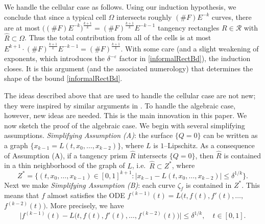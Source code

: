 \documentclass[letterpaper, reqno,11pt]{article}
\numberwithin{equation}{section}
\newcommand{\eps}{\varepsilon}
\numberwithin{thm}{section}
\theoremstyle{remark}
\begin{document}
We handle the cellular case as follows. Using our induction hypothesis, we conclude that since a typical cell $\Omega$ intersects roughly $(\#F) E^{-k}$ curves, there are at most $\big((\#F)E^{-k}\big)^{\frac{k+1}{k}}=(\#F)^{\frac{k+1}{k}}E^{-k-1}$ tangency rectangles $R\in \mathcal{R}$ with $\hat R \subset \Omega$. Thus the total contribution from all of the cells is at most $E^{k+1}\cdot (\#F)^{\frac{k+1}{k}}E^{-k-1} = (\#F)^{\frac{k+1}{k}}$. With some care (and a slight weakening of exponents, which introduces the $\delta^{-\eps}$ factor in \eqref{informalRectBd}), the induction closes. It is this argument (and the associated numerology) that determines the shape of the bound \eqref{informalRectBd}. 

The ideas described above that are used to handle the cellular case are not new; they were inspired by similar arguments in \cite{Guth}. To handle the algebraic case, however, new ideas are needed. This is the main innovation in this paper. We now sketch the proof of the algebraic case. We begin with several simplifying assumptions. \emph{Simplifying Assumption (A)}: the surface $\{Q=0\}$ can be written as a graph $\{x_{k-1} = L(t, x_0,\ldots, x_{k-2})\}$, where $L$ is $1$--Lipschitz. As a consequence of Assumption (A), if a tangency prism $\hat R$ intersects $\{Q=0\}$, then $\hat R$ is contained in a thin neighborhood of the graph of $L$, i.e.~$\hat R \subset Z^*$, where
\begin{equation}\label{informalDefnZStar}
 Z^* = \big\{(t, x_0,\ldots, x_{k-1})\in[0,1]^{k+1}\colon |x_{k-1} - L(t, x_0,\ldots,x_{k-2})|\leq \delta^{1/k}\big\}.
\end{equation}
Next we make \emph{Simplifying Assumption (B)}: each curve $\zeta_f$ is contained in $Z^*$. This means that $f$ almost satisfies the ODE $f^{(k-1)}(t) = L\big(t, f(t), f'(t), \ldots, $ $f^{(k-2)}(t)\big)$. More precisely, we have 
\begin{equation}\label{informalODE}
\big|f^{(k-1)}(t) - L\big(t, f(t), f'(t), \ldots, f^{(k-2)}(t)\big)\big|\leq \delta^{1/k},\quad t\in [0,1].
\end{equation}
\end{document}

